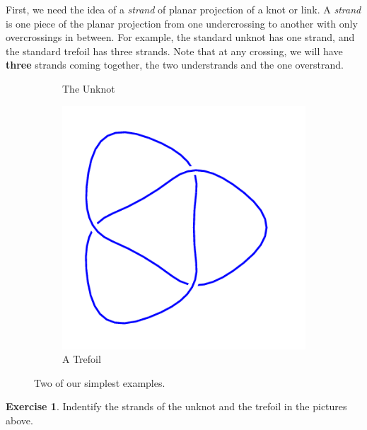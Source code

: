 \documentclass[12pt,letterpaper]{article}
\theoremstyle{definition}
\newtheorem{exercise}[question]{Exercise}
\begin{document}
First, we need the idea of a \emph{strand} of planar projection of a knot or link.
A \emph{strand} is one piece of the planar projection from one undercrossing to another with only overcrossings in between.
For example, the standard unknot has one strand, and the standard trefoil has three strands.
Note that at any crossing, we will have \textbf{three} strands coming together, the two understrands and the one overstrand.

\begin{figure}[h!]
    \centering
    \begin{subfigure}{.3\textwidth}
        \caption{The Unknot}
    \end{subfigure}
    \hspace{1cm}
    \begin{subfigure}{.3\textwidth}
        \includegraphics[width=\textwidth]{rgp08pics/3_1mirror.png}
        \caption{A Trefoil}
    \end{subfigure}
    \caption{Two of our simplest examples.}
\end{figure}

\begin{exercise}
Indentify the strands of the unknot and the trefoil in the pictures above.
\end{exercise}
\end{document}
